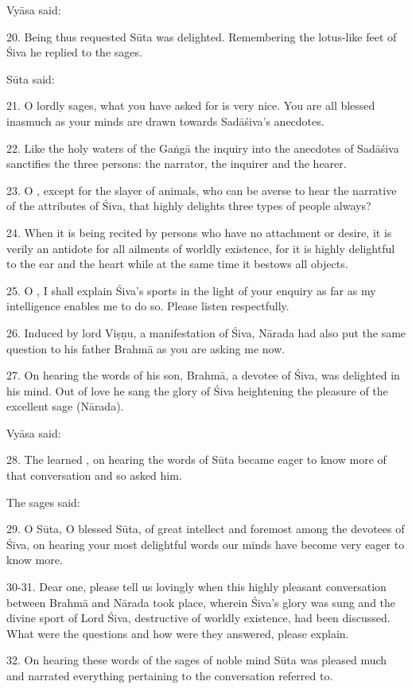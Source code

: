 Vyāsa said:

20. Being thus requested Sūta was delighted. Remembering the lotus-like feet of
Śiva he replied to the sages.

Sūta said:

21. O lordly sages, what you have asked for is very nice. You are all blessed
inasmuch as your minds are drawn towards Sadāśiva’s anecdotes.

22. Like the holy waters of the Gaṅgā the inquiry into the anecdotes of Sadāśiva
sanctifies the three persons: the narrator, the inquirer and the hearer.

23. O , except for the slayer of animals, who can be averse to
hear the narrative of the attributes of Śiva, that highly delights three types
of people always?

24. When it is being recited by persons who have no attachment or desire, it is
verily an antidote for all ailments of worldly existence, for it is highly
delightful to the ear and the heart while at the same time it bestows all objects.

25. O , I shall explain Śiva’s sports in the light of your enquiry
as far as my intelligence enables me to do so. Please listen respectfully.

26. Induced by lord Viṣṇu, a manifestation of Śiva, Nārada had also put the same
question to his father Brahmā as you are asking me now.

27. On hearing the words of his son, Brahmā, a devotee of Śiva, was delighted in
his mind. Out of love he sang the glory of Śiva heightening the pleasure of
the excellent sage (Nārada).

Vyāsa said:

28. The learned , on hearing the words of Sūta became eager to
know more of that conversation and so asked him.

The sages said:

29. O Sūta, O blessed Sūta, of great intellect and foremost among the devotees
of Śiva, on hearing your most delightful words our minds have become very eager
to know more.

30-31. Dear one, please tell us lovingly when this highly pleasant conversation
between Brahmā and Nārada took place, wherein Śiva’s glory was sung and
the divine sport of Lord Śiva, destructive of worldly existence, had been
discussed. What were the questions and how were they answered, please explain.

32. On hearing these words of the sages of noble mind Sūta was pleased much and
narrated everything pertaining to the conversation referred to.
